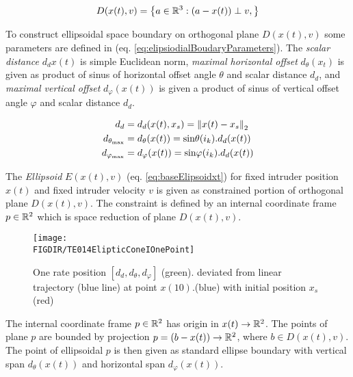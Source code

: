 \begin{equation}\label{eq:elisioidalOtrthogonalPlane}
    D({x}(t),{v})=\left\{{a}\in\mathbb{R}^3:({a}-{x}(t))\perp{v},\right\}
\end{equation}

To construct  ellipsoidal space boundary on orthogonal plane $D({x}(t),{v})$ some parameters are defined in (eq. \ref{eq:elipsiodialBoudaryParameters}). The \emph{scalar distance} $d_d{{x}(t)}$ is simple Euclidean norm, \emph{maximal horizontal offset} $d_\theta({x}_t)$ is given as product of sinus of horizontal offset angle $\theta$ and scalar distance $d_d$, and \emph{maximal vertical offset} $d_\varphi({x}(t))$ is given a product of sinus of vertical offset angle $\varphi$ and scalar distance $d_d$.

\begin{equation}\label{eq:elipsiodialBoudaryParameters}
    \begin{aligned}
     d_d                      &=d_d({x}(t),{x}_s) =\left\lVert{x}(t)-{x}_s\right\rVert_2\\ 
     d_{\theta_{\text{max}}}  &= d_\theta({x}(t))=\text{sin}\theta   (i_k).d_d({x}(t))\\
     d_{\varphi_{\text{max}}} &= d_\varphi({x}(t))=\text{sin}\varphi (i_k).d_d({x}(t)) 
    \end{aligned}
\end{equation}


\noindent The \emph{Ellipsoid} $E({x}(t),{v})$ (eq. \ref{eq:baseElipsoidxt}) for fixed intruder position ${x}(t)$ and fixed intruder velocity ${v}$ is given as constrained portion of orthogonal plane $D({x}(t),{v})$. The constraint is defined by an internal coordinate frame ${p}\in \mathbb{R}^2$ which is space reduction of plane $D({x}(t),{v})$. 


\begin{figure}[H]
    \centering
    \texttt{[image: \\FIGDIR/TE014ElipticConeIOnePoint]}         
    \caption{One rate position $[d_d,d_\theta,d_\varphi]$ (green). deviated from linear trajectory (blue line) at point ${x}(10)$.(blue) with initial position $x_s$ (red)}
    \label{fig:P21ElipticConeIOnePoint}
\end{figure}


The internal coordinate frame ${p}\in\mathbb{R}^2$ has origin in ${x}(t)\to\mathbb{R}^2$. The points of plane ${p}$ are bounded by projection ${p}=({b}-{x}(t))\to\mathbb{R}^2$, where $b\in D({x}(t),v)$. The point of ellipsoidal ${p}$ is then given as standard ellipse boundary with vertical span $d_\theta({x}(t))$ and horizontal span $d_\varphi({x}(t))$. 


